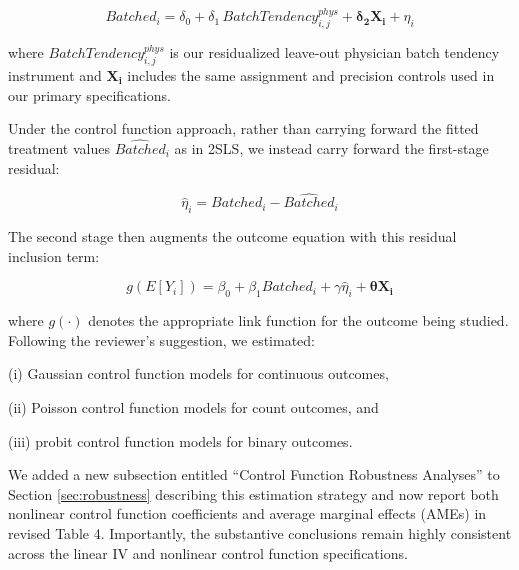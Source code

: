 \documentclass[11pt]{article}
\newcommand{\1}{\hbox{\rm 1\kern-.35em 1}}
\begin{document}
\[Batched_i = \delta_0 + \delta_1 \, BatchTendency_{i,j}^{phys} + \mathbf{\delta_2 X_i} + \eta_i\]

where \(BatchTendency_{i,j}^{phys}\) is our residualized leave-out physician batch tendency instrument and \(\mathbf{X_i}\) includes the same assignment and precision controls used in our primary specifications.

Under the control function approach, rather than carrying forward the fitted treatment values \(\widehat{Batched}_i\) as in 2SLS, we instead carry forward the first-stage residual:

\[\hat{\eta}_i = Batched_i - \widehat{Batched}_i\]

The second stage then augments the outcome equation with this residual inclusion term:

\[g(E[Y_i])=\beta_0+\beta_1 Batched_i+\gamma \hat{\eta}_i+\mathbf{\theta X_i}\]

where \(g(\cdot)\) denotes the appropriate link function for the outcome being studied. Following the reviewer's suggestion, we estimated:

(i) Gaussian control function models for continuous outcomes,

(ii) Poisson control function models for count outcomes, and

(iii) probit control function models for binary outcomes.

We added a new subsection entitled ``Control Function Robustness Analyses'' to Section \ref{sec:robustness} describing this estimation strategy and now report both nonlinear control function coefficients and average marginal effects (AMEs) in revised Table 4. Importantly, the substantive conclusions remain highly consistent across the linear IV and nonlinear control function specifications.
\end{document}
